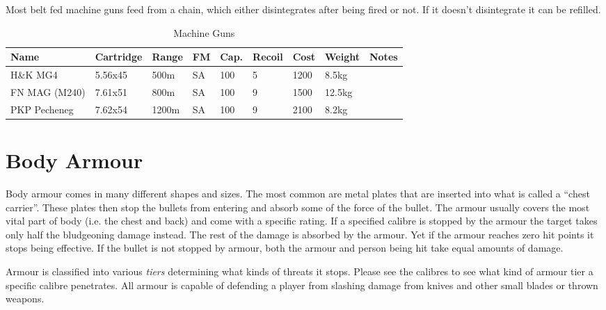 Most belt fed machine guns feed from a chain, which either disintegrates after
being fired or not. If it doesn't disintegrate it can be refilled.

\begin{table}
  \caption{Machine Guns}
  \label{tab:LMG}
  \begin{center}
    \begin{tabular}{| l | l | l | l | l | l | l | l | l |}
      \hline
      \textbf{Name} & \textbf{Cartridge} & \textbf{Range} &
      \textbf{FM} & \textbf{Cap.} & \textbf{Recoil} &
      \textbf{Cost} & \textbf{Weight} & \textbf{Notes} \\ \hline


      H\&K MG4      & 5.56x45 &  500m & SA & 100 & 5 & 1200 &  8.5kg & \\ \hline
      FN MAG (M240) & 7.61x51 &  800m & SA & 100 & 9 & 1500 & 12.5kg & \\ \hline
      PKP Pecheneg  & 7.62x54 & 1200m & SA & 100 & 9 & 2100 &  8.2kg & \\ \hline

    \end{tabular}
  \end{center}
\end{table}

\section{Body Armour}
\label{sec:9-Body Armour}

Body armour comes in many different shapes and sizes. The most common are metal
plates that are inserted into what is called a ``chest carrier''. These plates
then stop the bullets from entering and absorb some of the force of the bullet.
The armour usually covers the most vital part of body (i.e. the chest and back)
and come with a specific rating. If a specified calibre is stopped by the
armour the target takes only half the bludgeoning damage instead. The rest of
the damage is absorbed by the armour. Yet if the armour reaches zero hit points
it stops being effective. If the bullet is not stopped by armour, both the
armour and person being hit take equal amounts of damage.

Armour is classified into various \emph{tiers} determining what kinds of threats
it stops. Please see the calibres to see what kind of armour tier a specific
calibre penetrates. All armour is capable of defending a player from slashing
damage from knives and other small blades or thrown weapons.

